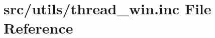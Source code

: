 \hypertarget{thread__win_8inc}{}\section{src/utils/thread\+\_\+win.inc File Reference}
\label{thread__win_8inc}
